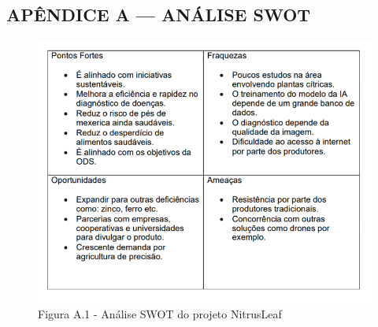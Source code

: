 
\begin{Appendix}

    \section{APÊNDICE A — ANÁLISE SWOT}%
    \label{sect:apx-a1}
    
    \begin{figure}[H]
    \centering
    \caption{Figura A.1 - Análise SWOT do projeto NitrusLeaf}%
    \label{fig:swot}
    \includegraphics[width=0.8\linewidth]{Illustrations/swot.png}
    \end{figure}
    
\end{Appendix}
    
    
\printindex%
    